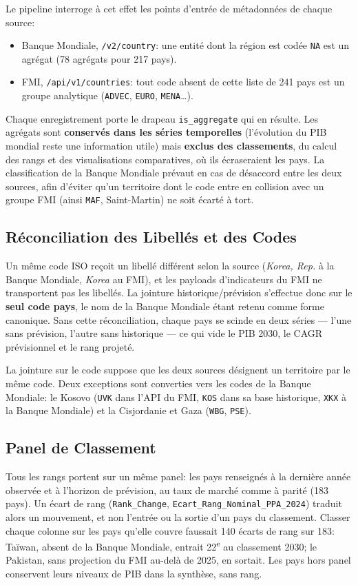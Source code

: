 \documentclass[11pt,a4paper]{article}
\begin{document}
Le pipeline interroge à cet effet les points d'entrée de métadonnées de chaque source:
\begin{itemize}
    \item Banque Mondiale, \texttt{/v2/country}: une entité dont la région est codée \texttt{NA} est un agrégat (78 agrégats pour 217 pays).
    \item FMI, \texttt{/api/v1/countries}: tout code absent de cette liste de 241 pays est un groupe analytique (\texttt{ADVEC}, \texttt{EURO}, \texttt{MENA}\ldots).
\end{itemize}

Chaque enregistrement porte le drapeau \texttt{is\_aggregate} qui en résulte. Les agrégats sont \textbf{conservés dans les séries temporelles} (l'évolution du PIB mondial reste une information utile) mais \textbf{exclus des classements}, du calcul des rangs et des visualisations comparatives, où ils écraseraient les pays. La classification de la Banque Mondiale prévaut en cas de désaccord entre les deux sources, afin d'éviter qu'un territoire dont le code entre en collision avec un groupe FMI (ainsi \texttt{MAF}, Saint-Martin) ne soit écarté à tort.

\subsection{Réconciliation des Libellés et des Codes}
Un même code ISO reçoit un libellé différent selon la source (\textit{Korea, Rep.} à la Banque Mondiale, \textit{Korea} au FMI), et les payloads d'indicateurs du FMI ne transportent pas les libellés. La jointure historique/prévision s'effectue donc sur le \textbf{seul code pays}, le nom de la Banque Mondiale étant retenu comme forme canonique. Sans cette réconciliation, chaque pays se scinde en deux séries — l'une sans prévision, l'autre sans historique — ce qui vide le PIB 2030, le CAGR prévisionnel et le rang projeté.

La jointure sur le code suppose que les deux sources désignent un territoire par le même code. Deux exceptions sont converties vers les codes de la Banque Mondiale: le Kosovo (\texttt{UVK} dans l'API du FMI, \texttt{KOS} dans sa base historique, \texttt{XKX} à la Banque Mondiale) et la Cisjordanie et Gaza (\texttt{WBG}, \texttt{PSE}).

\subsection{Panel de Classement}
Tous les rangs portent sur un même panel: les pays renseignés à la dernière année observée et à l'horizon de prévision, au taux de marché comme à parité (183 pays). Un écart de rang (\texttt{Rank\_Change}, \texttt{Ecart\_Rang\_Nominal\_PPA\_2024}) traduit alors un mouvement, et non l'entrée ou la sortie d'un pays du classement. Classer chaque colonne sur les pays qu'elle couvre faussait 140 écarts de rang sur 183: Taïwan, absent de la Banque Mondiale, entrait 22\textsuperscript{e} au classement 2030; le Pakistan, sans projection du FMI au-delà de 2025, en sortait. Les pays hors panel conservent leurs niveaux de PIB dans la synthèse, sans rang.
\end{document}
